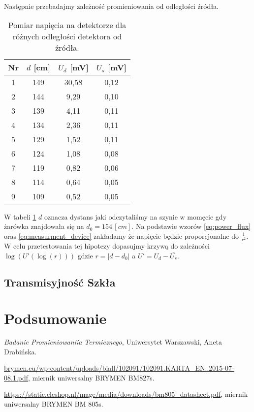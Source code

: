 \documentclass[12pt]{article}
\begin{document}
Następnie przebadajmy zależność promieniowania od odległości źródła.
\begin{table}[H]
    \centering
    \begin{tabular}{c|c|c|c}
        \toprule
        Nr & $d$ [cm] & $U_d$ [mV] & $U_s$ [mV] \\
        \midrule
        1 & 149 & 30{,}58 & 0{,}12 \\
        2 & 144 & 9{,}29  & 0{,}10 \\
        3 & 139 & 4{,}11  & 0{,}11 \\
        4 & 134 & 2{,}36  & 0{,}11 \\
        5 & 129 & 1{,}52  & 0{,}11 \\
        6 & 124 & 1{,}08  & 0{,}08 \\
        7 & 119 & 0{,}82  & 0{,}06 \\
        8 & 114 & 0{,}64  & 0{,}05 \\
        9 & 109 & 0{,}52  & 0{,}05 \\
        \bottomrule
    \end{tabular}
    \caption{Pomiar napięcia na detektorze dla różnych odległości detektora od źródła.}
    \label{tab:distance_measurements}
\end{table}
W tabeli \ref{tab:distance_measurements} $d$ oznacza dystans jaki odczytaliśmy na szynie w momęcie gdy żarówka znajdowała się na $d_0 = 154 \, [cm]$.
Na podstawie wzorów \eqref{eq:power_flux} oras \eqref{eq:measurment_device} zakładamy że napięcie będzie proporcjonalne do $\frac{1}{r^2}$. 
W celu przetestowania tej hipotezy dopasujmy krzywą do zależności $\log(U'(\log(r)))$ gdzie $r = |d-d_0|$ a $U' = U_d - \bar{U_s}$.

\subsection{Transmisyjność Szkła}


\section{Podsumowanie}



\newpage

\begin{thebibliography}{3}

\emph{Badanie Promieniowaniia Termicznego}, Uniwersytet Warszawski, Aneta Drabińska.

\url{brymen.eu/wp-content/uploads/biall/102091/102091.KARTA_EN..2015-07-08.1.pdf}, miernik uniwersalny BRYMEN BM827s.

\url{https://static.eleshop.nl/mage/media/downloads/bm805_datasheet.pdf}, miernik uniwersalny BRYMEN BM 805s.
\end{thebibliography}
\end{document}
